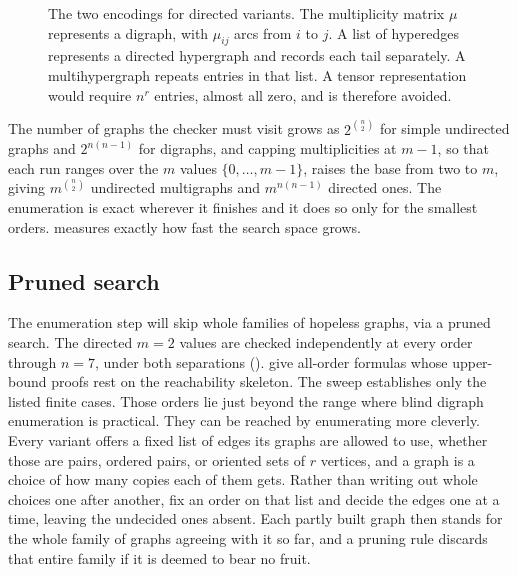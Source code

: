 \begin{figure}[ht]
\caption{The two encodings for directed variants. The multiplicity matrix $\mu$ represents a digraph, with $\mu_{ij}$ arcs from $i$ to $j$. A list of hyperedges represents a directed hypergraph and records each tail separately. A multihypergraph repeats entries in that list. A tensor representation would require $n^r$ entries, almost all zero, and is therefore avoided.}
\label{fig:matrix-rep}
\end{figure}

The number of graphs the checker must visit grows as $2^{\binom{n}{2}}$ for simple undirected graphs and $2^{n(n-1)}$ for digraphs,
and capping multiplicities at $m-1$, so that each run ranges over the $m$ values $\{0,\dots,m-1\}$, raises the base from two to $m$,
giving $m^{\binom{n}{2}}$ undirected multigraphs and $m^{n(n-1)}$ directed ones.
The enumeration is exact wherever it finishes and it does so only for the smallest orders.
 measures exactly how fast the search space grows.

\subsection{Pruned search}
The enumeration step will skip whole families of hopeless graphs, via a pruned search.
The directed $m=2$ values are checked independently at every order through $n=7$, under both separations ().
 give all-order formulas whose upper-bound proofs rest on the reachability skeleton. The sweep establishes only the listed finite cases.
Those orders lie just beyond the range where blind digraph enumeration is practical.
They can be reached by enumerating more cleverly.
Every variant offers a fixed list of edges its graphs are allowed to use,
whether those are pairs, ordered pairs, or oriented sets of $r$ vertices,
and a graph is a choice of how many copies each of them gets.
Rather than writing out whole choices one after another,
fix an order on that list and decide the edges one at a time,
leaving the undecided ones absent.
Each partly built graph then stands for the whole family of graphs agreeing with it so far,
and a pruning rule discards that entire family if it is deemed to bear no fruit.

